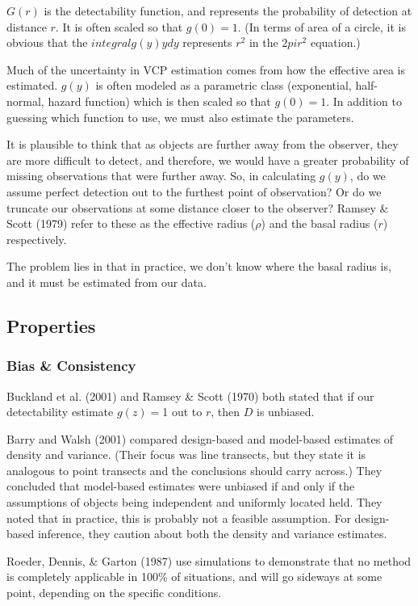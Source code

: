 \documentclass[12pt]{article}
\begin{document}
$G(r)$ is the detectability function, and represents the probability of detection at distance $r$. It is often scaled so that $g(0)=1$. (In terms of area of a circle, it is obvious that the $integral{g(y)ydy}$ represents $r^2$ in the $2pi r^2$ equation.)

Much of the uncertainty in VCP estimation comes from how the effective area is estimated. $g(y)$ is often modeled as a parametric class (exponential, half-normal, hazard function) which is then scaled so that $g(0)=1$. In addition to guessing which function to use, we must also estimate the parameters. 

It is plausible to think that as objects are further away from the observer, they are more difficult to detect, and therefore, we would have a greater probability of missing observations that were further away. So, in calculating $g(y)$, do we assume perfect detection out to the furthest point of observation? Or do we truncate our observations at some distance closer to the observer? Ramsey \& Scott (1979) refer to these as the effective radius ($\rho$) and the basal radius ($r$) respectively. 

The problem lies in that in practice, we don't know where the basal radius is, and it must be estimated from our data.

\subsection{Properties}
\subsubsection{Bias \& Consistency}
Buckland et al. (2001) and Ramsey \& Scott (1970) both stated that if our detectability estimate $g(z)=$1 out to $r$, then $D$ is unbiased. 

Barry and Walsh (2001) compared design-based and  model-based estimates of density and variance. (Their focus was line transects, but they state it is analogous to point transects and the conclusions should carry across.) They concluded that model-based estimates were unbiased if and only if the assumptions of objects being independent and uniformly located held. They noted that in practice, this is probably not a feasible assumption. For design-based inference, they caution about both the density and variance estimates.

Roeder, Dennis, \& Garton (1987) use simulations to demonstrate that no method is completely applicable in 100\% of situations, and will go sideways at some point, depending on the specific conditions.
\end{document}
